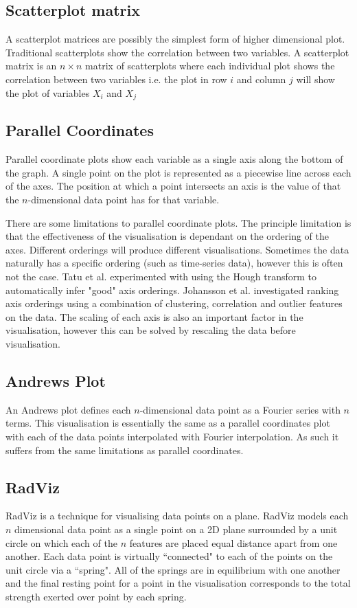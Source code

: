 \subsection{Scatterplot matrix}
A scatterplot matrices are possibly the simplest form of higher dimensional plot. Traditional scatterplots show the correlation between two variables. A scatterplot matrix is an $n \times n$ matrix of scatterplots where each individual plot shows the correlation between two variables i.e. the plot in row $i$ and column $j$ will show the plot of variables $X_i$ and $X_j$ 

\subsection{Parallel Coordinates}
Parallel coordinate plots \cite{inselberg1991parallel} show each variable as a single axis along the bottom of the graph. A single point on the plot is represented as a piecewise line across each of the axes. The position at which a point intersects an axis is the value of that the $n$-dimensional data point has for that variable.

There are some limitations to parallel coordinate plots. The principle limitation is that the effectiveness of the visualisation is dependant on the ordering of the axes. Different orderings will produce different visualisations. Sometimes the data naturally has a specific ordering (such as time-series data), however this is often not the case. Tatu et al. \cite{tatu2009combining} experimented with using the Hough transform to automatically infer "good" axis orderings. Johansson et al. \cite{johansson2009interactive} investigated ranking axis orderings using a combination of clustering, correlation and outlier features on the data. The scaling of each axis is also an important factor in the visualisation, however this can be solved by rescaling the data before visualisation.

\subsection{Andrews Plot}
An Andrews plot defines each $n$-dimensional data point as a Fourier series with $n$ terms. This visualisation is essentially the same as a parallel coordinates plot with each of the data points interpolated with Fourier interpolation. As such it suffers from the same limitations as parallel coordinates.

\subsection{RadViz}
RadViz \cite{novakova2009radviz} is a technique for visualising data points on a plane. RadViz models each $n$ dimensional data point as a single point on a 2D plane surrounded by a unit circle on which each of the $n$ features are placed equal distance apart from one another. Each data point is virtually ``connected" to each of the points on the unit circle via a ``spring". All of the springs are in equilibrium with one another and the final resting point for a point in the visualisation corresponds to the total strength exerted over point by each spring.

